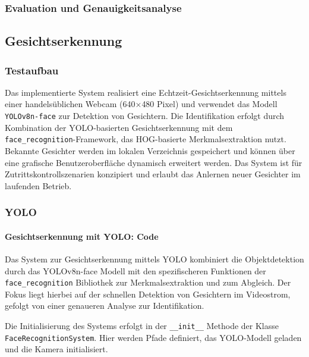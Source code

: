 \subsubsection{Evaluation und Genauigkeitsanalyse}


\subsection{Gesichtserkennung}
\subsubsection{Testaufbau}
Das implementierte System realisiert eine Echtzeit-Gesichtserkennung mittels einer handelsüblichen Webcam (640$\times$480 Pixel) und verwendet das Modell \texttt{YOLOv8n-face} zur Detektion von Gesichtern. Die Identifikation erfolgt durch Kombination der YOLO-basierten Gesichtserkennung mit dem \texttt{face\_recognition}-Framework, das HOG-basierte Merkmalsextraktion nutzt. Bekannte Gesichter werden im lokalen Verzeichnis gespeichert und können über eine grafische Benutzeroberfläche dynamisch erweitert werden. Das System ist für Zutrittskontrollszenarien konzipiert und erlaubt das Anlernen neuer Gesichter im laufenden Betrieb.

\subsubsection{YOLO}
\paragraph{Gesichtserkennung mit YOLO: Code}

Das System zur Gesichtserkennung mittels YOLO kombiniert die Objektdetektion durch das YOLOv8n-face Modell mit den spezifischeren Funktionen der \texttt{face\_recognition} Bibliothek zur Merkmalsextraktion und zum Abgleich. Der Fokus liegt hierbei auf der schnellen Detektion von Gesichtern im Videostrom, gefolgt von einer genaueren Analyse zur Identifikation.

Die Initialisierung des Systems erfolgt in der \texttt{\_\_init\_\_} Methode der Klasse \texttt{FaceRecognitionSystem}. Hier werden Pfade definiert, das YOLO-Modell geladen und die Kamera initialisiert.

